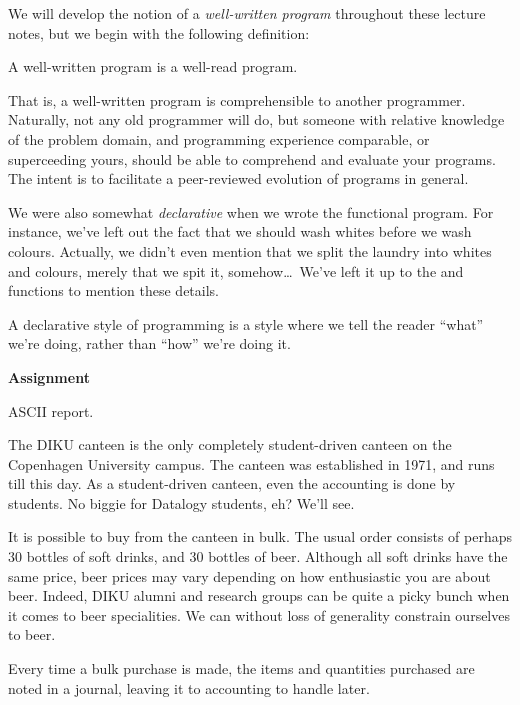 We will develop the notion of a \emph{well-written program} throughout these
lecture notes, but we begin with the following definition:

\begin{definition}

A well-written program is a well-read program.

\end{definition}

That is, a well-written program is comprehensible to another programmer.
Naturally, not any old programmer will do, but someone with relative knowledge
of the problem domain, and programming experience comparable, or superceeding
yours, should be able to comprehend and evaluate your programs. The intent is
to facilitate a peer-reviewed evolution of programs in general.

We were also somewhat \emph{declarative} when we wrote the functional program.
For instance, we've left out the fact that we should wash whites before we wash
colours. Actually, we didn't even mention that we split the laundry into whites
and colours, merely that we spit it, somehow\ldots\ We've left it up to the
 and  functions to mention these details.

\begin{definition}

A declarative style of programming is a style where we tell the reader ``what''
we're doing, rather than ``how'' we're doing it.

\end{definition}

{\bf Assignment}

ASCII report.

The DIKU canteen is the only completely student-driven canteen on the
Copenhagen University campus. The canteen was established in 1971, and runs
till this day. As a student-driven canteen, even the accounting is done by
students. No biggie for Datalogy students, eh? We'll see.

It is possible to buy from the canteen in bulk. The usual order consists of
perhaps 30 bottles of soft drinks, and 30 bottles of beer. Although all soft
drinks have the same price, beer prices may vary depending on how enthusiastic
you are about beer. Indeed, DIKU alumni and research groups can be quite a
picky bunch when it comes to beer specialities. We can without loss of
generality constrain ourselves to beer.

Every time a bulk purchase is made, the items and quantities purchased are
noted in a journal, leaving it to accounting to handle later.

